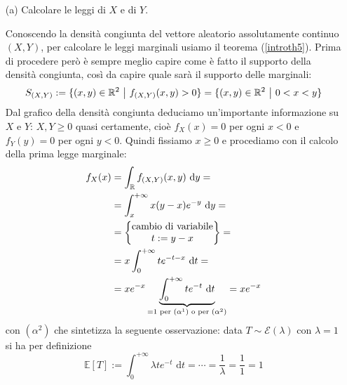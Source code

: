 \Soluzione{}
\begin{enumerate}
\item [(a)] Calcolare le leggi di $X$ e di $Y$.

Conoscendo la densità congiunta del vettore aleatorio assolutamente continuo $(X,Y)$, per calcolare le leggi marginali usiamo il teorema (\ref{introth5}). Prima di procedere però è sempre meglio capire come è fatto il supporto della densità congiunta, così da capire quale sarà il supporto delle marginali:
\[
S_{(X,Y)}:=\{(x,y)\in\RR^2\ \big|\ f_{(X,Y)}(x,y)>0   \}=\{(x,y)\in\RR^2\ \big|\ 0<x<y   \}
\]
Dal grafico della densità congiunta deduciamo un'importante informazione su $X$ e $Y$: $X,Y\geq 0$ quasi certamente, cioè $f_X(x)=0$ per ogni $x<0$ e $f_Y(y)=0$ per ogni $y<0$. Quindi fissiamo $x\geq 0$ e procediamo con il calcolo della prima legge marginale:
\begin{gather*}
\begin{aligned}
f_X(x)&=\int_{\mathbb{R}} f_{(X,Y)}(x,y)\text{ d}y= \\
&=\int_x^{+\infty}x(y-x)e^{-y}\text{ d}y= \\
&=\begin{Bmatrix}
\text{cambio di variabile}\\t:=y-x 
\end{Bmatrix}= \\
&=x\int_0^{+\infty}te^{-t-x}\text{ d}t=\\
&=xe^{-x}\underbrace{\int_0^{+\infty}te^{-t}\text{ d}t}_{=1 \text{ per } (\alpha^1)\text{ o per }(\alpha^2)}=xe^{-x}
\end{aligned}
\end{gather*}
con $(\alpha^2)$ che sintetizza la seguente osservazione: data $T\sim\mathcal{E}(\lambda)$ con $\lambda=1$ si ha per definizione
\begin{equation*}
\mathbb{E}[T]:=\int_0^{+\infty}\lambda te^{-t}\text{ d}t=\cdots=\frac{1}{\lambda}=\frac{1}{1}=1
\end{equation*}


\end{enumerate}
